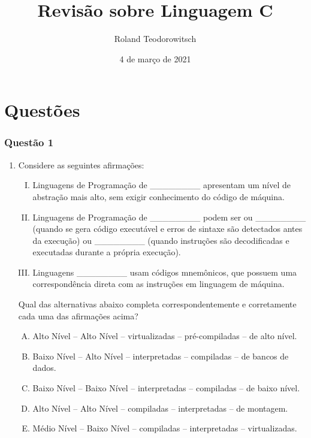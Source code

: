 \documentclass[aspectratio=169]{beamer}
\title[\sc{Revisão sobre Linguagem C}]{Revisão sobre Linguagem C}
\author[Roland Teodorowitsch]{Roland Teodorowitsch}
\institute[POO - EC - PUCRS]{Programação Orientada a Objetos - ECo - Curso de Engenharia de Computação - PUCRS}
\date{4 de março de 2021}
\newcommand\setItemnumber[1]{\setcounter{enumi}{\numexpr#1-1\relax}}
\begin{document}
\justifying

\begin{frame}
	\titlepage
\end{frame}

\section{Questões}

\begin{frame}\frametitle{Questão 1}
\begin{enumerate}
\setItemnumber{1}
\item Considere as seguintes afirmações:
	\begin{enumerate}[I.]
	\item Linguagens de Programação de \_\_\_\_\_\_\_\_ apresentam um nível de abstração mais alto, sem exigir conhecimento do código de máquina.
	\item Linguagens de Programação de \_\_\_\_\_\_\_\_ podem ser ou \_\_\_\_\_\_\_\_ (quando se gera código executável e erros de sintaxe são detectados antes da execução) ou \_\_\_\_\_\_\_\_ (quando instruções são decodificadas e executadas durante a própria execução).
	\item Linguagens \_\_\_\_\_\_\_\_ usam códigos mnemônicos, que possuem uma correspondência direta com as instruções em linguagem de máquina.
	\end{enumerate}

Qual das alternativas abaixo completa correspondentemente e corretamente cada uma das afirmações acima?
	\begin{enumerate}[(A)]
	\item Alto Nível -- Alto Nível -- virtualizadas -- pré-compiladas -- de alto nível.
	\item Baixo Nível -- Alto Nível -- interpretadas -- compiladas -- de bancos de dados.
	\item Baixo Nível -- Baixo Nível -- interpretadas -- compiladas -- de baixo nível.
	\item Alto Nível -- Alto Nível -- compiladas -- interpretadas -- de montagem.
	\item Médio Nível -- Baixo Nível -- compiladas -- interpretadas -- virtualizadas.
	\end{enumerate}
\end{enumerate}
\end{frame}
\end{document}
